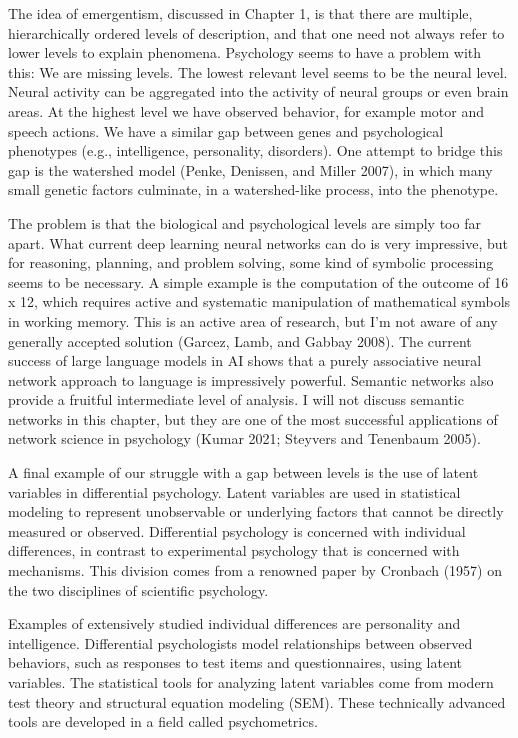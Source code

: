 \documentclass[
  letterpaper,
]{scrbook}
\begin{document}
The idea of emergentism, discussed in Chapter 1, is that there are
multiple, hierarchically ordered levels of description, and that one
need not always refer to lower levels to explain phenomena. Psychology
seems to have a problem with this: We are missing levels. The lowest
relevant level seems to be the neural level. Neural activity can be
aggregated into the activity of neural groups or even brain areas. At
the highest level we have observed behavior, for example motor and
speech actions. We have a similar gap between genes and psychological
phenotypes (e.g., intelligence, personality, disorders). One attempt to
bridge this gap is the watershed model (Penke, Denissen, and Miller
2007), in which many small genetic factors culminate, in a
watershed-like process, into the phenotype.

The problem is that the biological and psychological levels are simply
too far apart. What current deep learning neural networks can do is very
impressive, but for reasoning, planning, and problem solving, some kind
of symbolic processing seems to be necessary. A simple example is the
computation of the outcome of 16 x 12, which requires active and
systematic manipulation of mathematical symbols in working memory. This
is an active area of research, but I'm not aware of any generally
accepted solution (Garcez, Lamb, and Gabbay 2008). The current success
of large language models in AI shows that a purely associative neural
network approach to language is impressively powerful. Semantic networks
also provide a fruitful intermediate level of analysis. I will not
discuss semantic networks in this chapter, but they are one of the most
successful applications of network science in psychology (Kumar 2021;
Steyvers and Tenenbaum 2005).

A final example of our struggle with a gap between levels is the use of
latent variables in differential psychology. Latent variables are used
in statistical modeling to represent unobservable or underlying factors
that cannot be directly measured or observed. Differential psychology is
concerned with individual differences, in contrast to experimental
psychology that is concerned with mechanisms. This division comes from a
renowned paper by Cronbach (1957) on the two disciplines of scientific
psychology.

Examples of extensively studied individual differences are personality
and intelligence. Differential psychologists model relationships between
observed behaviors, such as responses to test items and questionnaires,
using latent variables. The statistical tools for analyzing latent
variables come from modern test theory and structural equation modeling
(SEM). These technically advanced tools are developed in a field called
psychometrics.
\end{document}
